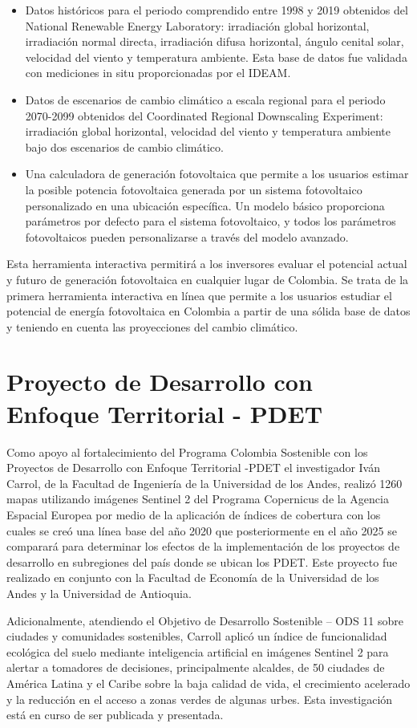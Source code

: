 \begin{itemize}
    \item Datos históricos para el periodo comprendido entre 1998 y 2019 obtenidos del National Renewable Energy Laboratory: irradiación global horizontal, 
irradiación normal directa, irradiación difusa horizontal, ángulo cenital solar, velocidad del viento y temperatura ambiente. Esta base de datos fue validada 
con mediciones in situ proporcionadas por el IDEAM.
    \item Datos de escenarios de cambio climático a escala regional para el periodo 2070-2099 obtenidos del Coordinated Regional Downscaling Experiment: 
irradiación global horizontal, velocidad del viento y temperatura ambiente bajo dos escenarios de cambio climático.
    \item Una calculadora de generación fotovoltaica que permite a los usuarios estimar la posible potencia fotovoltaica generada por un sistema fotovoltaico 
personalizado en una ubicación específica. Un modelo básico proporciona parámetros por defecto para el sistema fotovoltaico, y todos los parámetros 
fotovoltaicos pueden personalizarse a través del modelo avanzado.
\end{itemize}

Esta herramienta interactiva permitirá a los inversores evaluar el potencial actual y futuro de generación fotovoltaica en cualquier lugar de Colombia. Se trata 
de la primera herramienta interactiva en línea que permite a los usuarios estudiar el potencial de energía fotovoltaica en Colombia a partir de una sólida base 
de datos y teniendo en cuenta las proyecciones del cambio climático.

\section{Proyecto de Desarrollo con Enfoque Territorial - PDET}
Como apoyo al fortalecimiento del Programa Colombia Sostenible con los Proyectos de Desarrollo con Enfoque Territorial -PDET el investigador Iván Carrol, de la 
Facultad de Ingeniería de la Universidad de los Andes, realizó 1260 mapas utilizando imágenes Sentinel 2 del Programa Copernicus de la Agencia Espacial Europea 
por medio de la aplicación de índices de cobertura con los cuales se creó una línea base del año 2020 que posteriormente en el año 2025 se comparará para 
determinar los efectos de la implementación de los proyectos de desarrollo en subregiones del país donde se ubican los PDET. Este proyecto fue realizado en 
conjunto con la Facultad de Economía de la Universidad de los Andes y la Universidad de Antioquia.

Adicionalmente, atendiendo el Objetivo de Desarrollo Sostenible – ODS 11 sobre ciudades y comunidades sostenibles, Carroll aplicó un índice de funcionalidad
ecológica del suelo mediante inteligencia artificial en imágenes Sentinel 2 para alertar a tomadores de decisiones, principalmente alcaldes, de 50 ciudades de 
América Latina y el Caribe sobre la baja calidad de vida, el crecimiento acelerado y la reducción en el acceso a zonas verdes de algunas urbes. Esta 
investigación está en curso de ser publicada y presentada.
